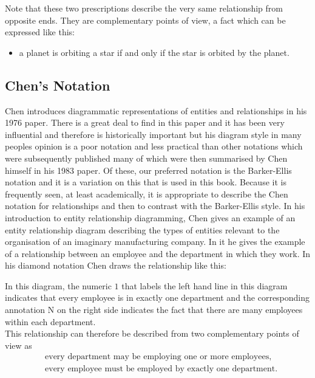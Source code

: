 Note that these two prescriptions describe the very same relationship from opposite ends. 
They are complementary points of view, a fact which  can be expressed like this:
\begin{itemize}
\item a planet is orbiting a star if and only if the star is orbited by the planet.
\end{itemize}
\subsection*{Chen's Notation}
\mynote
Chen introduces diagrammatic representations of entities and relationships in his 
1976 paper. There is a great deal to find in this paper and it has been very influential and therefore is historically important but his diagram style in many peoples opinion is a poor notation and less practical than other notations which were subsequently published many of which were then summarised by Chen himself in his 1983 paper. 
Of these, our preferred notation is the Barker-Ellis notation and it is a variation on this that is used in this book. 
Because it is frequently seen, at least academically, it is appropriate
to describe the Chen notation for relationships and then to contrast with the Barker-Ellis style.
\mynote
In his introduction to entity relationship diagramming, Chen gives an example of an entity relationship diagram describing the types of entities relevant to the organisation of an imaginary manufacturing company.
In it he gives the example of a relationship between an employee and the department in which they work. In his diamond notation Chen draws the relationship like this:
\begin{center}
\scalebox{0.9}{}
\end{center}

\noindent In this diagram, the numeric $1$ that labels the left hand line in this diagram indicates that every employee is in exactly one department and the corresponding annotation N on the right side indicates the fact that there are many employees within each department. \\

\noindent This relationship can therefore be described from  two complementary points of view as
\begin{align}
\label{employingText}&\mbox{every department may be employing one or more employees,} \\
\label{employedByText}&\mbox{every employee must be employed by exactly one department.}
\end{align}


